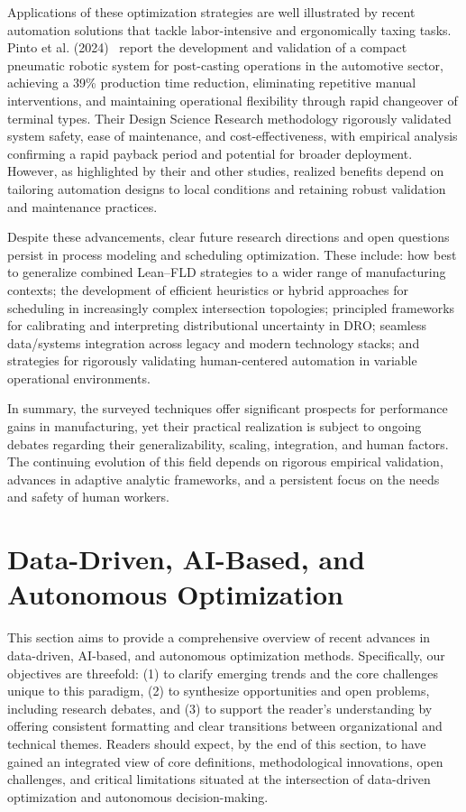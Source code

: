 \documentclass[sigconf]{acmart}
\begin{document}
Applications of these optimization strategies are well illustrated by recent automation solutions that tackle labor-intensive and ergonomically taxing tasks. Pinto et al. (2024)~\cite{ref62} report the development and validation of a compact pneumatic robotic system for post-casting operations in the automotive sector, achieving a 39\% production time reduction, eliminating repetitive manual interventions, and maintaining operational flexibility through rapid changeover of terminal types. Their Design Science Research methodology rigorously validated system safety, ease of maintenance, and cost-effectiveness, with empirical analysis confirming a rapid payback period and potential for broader deployment. However, as highlighted by their and other studies, realized benefits depend on tailoring automation designs to local conditions and retaining robust validation and maintenance practices.

Despite these advancements, clear future research directions and open questions persist in process modeling and scheduling optimization. These include: how best to generalize combined Lean–FLD strategies to a wider range of manufacturing contexts; the development of efficient heuristics or hybrid approaches for scheduling in increasingly complex intersection topologies; principled frameworks for calibrating and interpreting distributional uncertainty in DRO; seamless data/systems integration across legacy and modern technology stacks; and strategies for rigorously validating human-centered automation in variable operational environments.

In summary, the surveyed techniques offer significant prospects for performance gains in manufacturing, yet their practical realization is subject to ongoing debates regarding their generalizability, scaling, integration, and human factors. The continuing evolution of this field depends on rigorous empirical validation, advances in adaptive analytic frameworks, and a persistent focus on the needs and safety of human workers.

\section{Data-Driven, AI-Based, and Autonomous Optimization}

This section aims to provide a comprehensive overview of recent advances in data-driven, AI-based, and autonomous optimization methods. Specifically, our objectives are threefold: (1) to clarify emerging trends and the core challenges unique to this paradigm, (2) to synthesize opportunities and open problems, including research debates, and (3) to support the reader's understanding by offering consistent formatting and clear transitions between organizational and technical themes. Readers should expect, by the end of this section, to have gained an integrated view of core definitions, methodological innovations, open challenges, and critical limitations situated at the intersection of data-driven optimization and autonomous decision-making.
\end{document}
